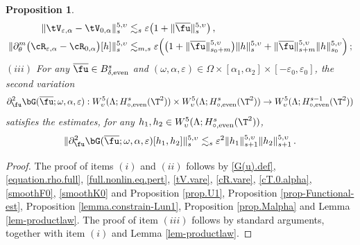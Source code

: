 \documentclass[a4paper,reqno,10pt]{article}
\newtheorem{pro}{Proposition}[section]
\newcommand{\pa}{\partial}
\begin{document}
\begin{pro}
\begin{align}
	\| \tV_{\varepsilon,\alpha} - \tV_{0,\alpha} \|_{s}^{5,\upsilon} & \lesssim_{s} \varepsilon \big( 1 + \| \overline{\fu} \|_{s}^{5,\upsilon} \big) \,, \\
	\| \partial_\theta^m \big( \cR_{\varepsilon,\alpha}-\cR_{0,\alpha} \big) [h] \|_{s}^{5,\upsilon} & \lesssim_{m,s} \varepsilon \Big( {\big(1+\| \overline{\fu}\|_{s_0+m}^{5,\upsilon}\big)}\| h\|_{s}^{5,\upsilon} + \| \overline{\fu}\|_{s{+m}}^{5,\upsilon}  \| h\|_{s_0}^{5,\upsilon}  \Big) \,;
\end{align}
\noindent $(iii)$ For any $\overline{\fu} \in B_{\delta,{\rm even}}^{s}$ and $(\omega,\alpha,\varepsilon)\in \Omega\times [\alpha_1,\alpha_2]\times [-\varepsilon_0,\varepsilon_0]$,  the second variation 
$$\pa_{\fu}^2\bG(\overline{\fu};\omega,\alpha,\varepsilon):W_\upsilon^5(\Lambda;H_{\circ,{\rm even}}^s(\T^2)) \times W_\upsilon^5(\Lambda;H_{\circ,{\rm even}}^s(\T^2)) \to W_\upsilon^5(\Lambda;H_{\circ,{\rm even}}^{s-1}(\T^2)) $$
satisfies the estimates, for any  $h_1,h_2\in {W_\upsilon^5(\Lambda;H_{\circ,{\rm even}}^s(\T^2))}$,
\begin{equation}
    \|\pa_{\fu}^2\bG(\overline{\fu};\omega,\alpha,\varepsilon)[h_1,h_2]\|_{s}^{5,\upsilon} \lesssim_s \varepsilon^2 \|h_1 \|_{s+1}^{5,\upsilon} \|h_2 \|_{s+1}^{5,\upsilon} \,.
\end{equation}
    \end{pro}
\begin{proof}
    The proof of items $(i)$ and $(ii)$ follows by \eqref{G(u).def}, \eqref{equation.rho.full}, \eqref{full.nonlin.eq.pert}, \eqref{tV.vare}, \eqref{cR.vare}, \eqref{cT.0.alpha}, \eqref{smoothF0}, \eqref{smoothK0} and Proposition \ref{prop.U1}, Proposition \ref{prop-Functional-est}, Proposition \ref{lemma.constrain-Lun1}, Proposition \ref{prop.Malpha} and Lemma \ref{lem-productlaw}. The proof of item $(iii)$ follows by standard arguments, together with item $(i)$ and Lemma \ref{lem-productlaw}.
\end{proof}
\end{document}
